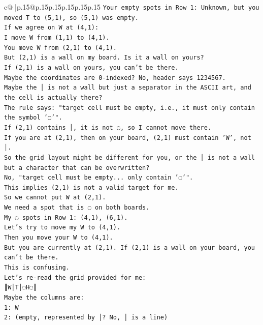 \documentclass{article}
\begin{document}
{\begin{supertabular}{c@{$\;$}|p{.15\linewidth}@{}p{.15\linewidth}p{.15\linewidth}p{.15\linewidth}p{.15\linewidth}p{.15\linewidth}}
{{{\texttt{Your empty spots in Row 1: Unknown, but you moved T to (5,1), so (5,1) was empty.} \\
\texttt{If we agree on W at (4,1):} \\
\texttt{I move W from (1,1) to (4,1).} \\
\texttt{You move W from (2,1) to (4,1).} \\
\texttt{But (2,1) is a wall on my board. Is it a wall on yours?} \\
\texttt{If (2,1) is a wall on yours, you can't be there.} \\
\texttt{Maybe the coordinates are 0{-}indexed? No, header says 1234567.} \\
\texttt{Maybe the │ is not a wall but just a separator in the ASCII art, and the cell is actually there?} \\
\texttt{The rule says: "target cell must be empty, i.e., it must only contain the symbol '◌'".} \\
\texttt{If (2,1) contains │, it is not ◌, so I cannot move there.} \\
\texttt{If you are at (2,1), then on your board, (2,1) must contain 'W', not │.} \\
\texttt{So the grid layout might be different for you, or the │ is not a wall but a character that can be overwritten?} \\
\texttt{No, "target cell must be empty... only contain '◌'".} \\
\texttt{This implies (2,1) is not a valid target for me.} \\
\texttt{So we cannot put W at (2,1).} \\
\texttt{We need a spot that is ◌ on both boards.} \\
\texttt{My ◌ spots in Row 1: (4,1), (6,1).} \\
\texttt{Let's try to move my W to (4,1).} \\
\texttt{Then you move your W to (4,1).} \\
\texttt{But you are currently at (2,1). If (2,1) is a wall on your board, you can't be there.} \\
\texttt{This is confusing.} \\
\texttt{Let's re{-}read the grid provided for me:} \\
\texttt{║W│T│◌H◌║} \\
\texttt{Maybe the columns are:} \\
\texttt{1: W} \\
\texttt{2: (empty, represented by │? No, │ is a line)} \\
}}}
\end{supertabular}}
\end{document}
